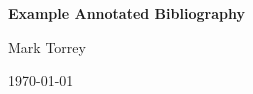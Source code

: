 \documentclass[12pt]{article}
\begin{document}
\begin{center}
   {\Large\textbf{Example Annotated Bibliography}}
\medskip

   {\large  Mark Torrey
\medskip

\medskip

           \today
   }
\end{center}
\nocite{*} %

%


\end{document}
